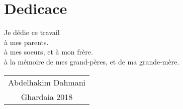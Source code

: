 \chapter*{Dedicace}
 \begin{center}
Je dédie ce travail \\ 
à mes parents.\\
à mes soeurs, et à mon frère.\\
à la mémoire de mes grand-pères, et de ma grande-mère.

 \end{center}
 
 
 

 
  
    
  \vfill \hfill
  \begin{tabular}{c}
   Abdelhakim   Dahmani \\
   Ghardaia   2018
  \end{tabular}


